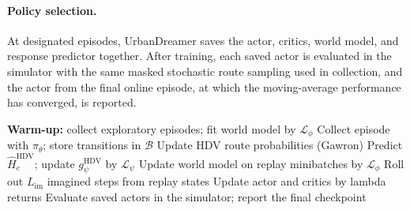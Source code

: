 \paragraph{Policy selection.}
At designated episodes, UrbanDreamer saves the actor, critics, world model,
and response predictor together.  After training, each saved actor is
evaluated in the simulator with the same masked stochastic route sampling used
in collection, and the actor from the final online episode, at which the
moving-average performance has converged, is reported.

\begin{algorithm}[t]
\caption{Online training of UrbanDreamer}
\label{alg:urbandreamer}
\small
\begin{algorithmic}
\STATE \textbf{Warm-up:} collect exploratory episodes; fit world model by \(\mathcal{L}_\phi\)
  \STATE Collect episode with \(\pi_\theta\); store transitions in \(\mathcal{B}\)
  \STATE Update HDV route probabilities (Gawron)
  \STATE Predict \(\hat H_e^{\mathrm{HDV}}\); update \(g_\psi^{\mathrm{HDV}}\) by \(\mathcal{L}_\psi\)
  \STATE Update world model on replay minibatches by \(\mathcal{L}_\phi\)
    \STATE Roll out \(L_{\mathrm{im}}\) imagined steps from replay states
    \STATE Update actor and critics by lambda returns
  \ENDFOR
\ENDFOR
\STATE Evaluate saved actors in the simulator; report the final checkpoint
\end{algorithmic}
\end{algorithm}
